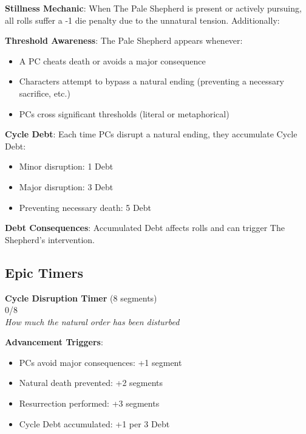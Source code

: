 \documentclass[11pt]{article}
\newcommand{\timersegment}{\textbullet}
\begin{document}
\begin{mdframed}[backgroundcolor=mechanicbg]
\textbf{Stillness Mechanic}: When The Pale Shepherd is present or actively pursuing, all rolls suffer a -1 die penalty due to the unnatural tension. Additionally:

\textbf{Threshold Awareness}: The Pale Shepherd appears whenever:
\begin{itemize}[leftmargin=*]
\item A PC cheats death or avoids a major consequence
\item Characters attempt to bypass a natural ending (preventing a necessary sacrifice, etc.)
\item PCs cross significant thresholds (literal or metaphorical)
\end{itemize}

\textbf{Cycle Debt}: Each time PCs disrupt a natural ending, they accumulate Cycle Debt:
\begin{itemize}[leftmargin=*]
\item Minor disruption: 1 Debt
\item Major disruption: 3 Debt  
\item Preventing necessary death: 5 Debt
\end{itemize}

\textbf{Debt Consequences}: Accumulated Debt affects rolls and can trigger The Shepherd's intervention.
\end{mdframed}

\subsection*{Epic Timers}

\begin{center}
\textbf{Cycle Disruption Timer } (8 segments)\\
\fbox{\timersegment\timersegment\timersegment\timersegment\timersegment\timersegment\timersegment\timersegment} 0/8\\
\textit{How much the natural order has been disturbed}
\end{center}

\textbf{Advancement Triggers}:
\begin{itemize}[leftmargin=*]
\item PCs avoid major consequences: +1 segment
\item Natural death prevented: +2 segments
\item Resurrection performed: +3 segments
\item Cycle Debt accumulated: +1 per 3 Debt
\end{itemize}
\end{document}
